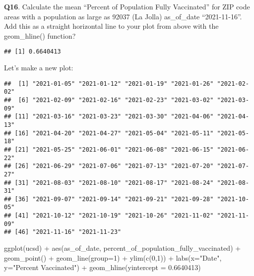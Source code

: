 \documentclass[
]{article}
\newenvironment{Shaded}{\begin{snugshade}}{\end{snugshade}}
\newcommand{\AttributeTok}[1]{\textcolor[rgb]{0.77,0.63,0.00}{#1}}
\newcommand{\DecValTok}[1]{\textcolor[rgb]{0.00,0.00,0.81}{#1}}
\newcommand{\FloatTok}[1]{\textcolor[rgb]{0.00,0.00,0.81}{#1}}
\newcommand{\FunctionTok}[1]{\textcolor[rgb]{0.00,0.00,0.00}{#1}}
\newcommand{\NormalTok}[1]{#1}
\newcommand{\SpecialCharTok}[1]{\textcolor[rgb]{0.00,0.00,0.00}{#1}}
\newcommand{\StringTok}[1]{\textcolor[rgb]{0.31,0.60,0.02}{#1}}
\begin{document}
\textbf{Q16}. Calculate the mean ``Percent of Population Fully
Vaccinated'' for ZIP code areas with a population as large as 92037 (La
Jolla) as\_of\_date ``2021-11-16''. Add this as a straight horizontal
line to your plot from above with the geom\_hline() function?

\begin{Shaded}
\end{Shaded}

\begin{verbatim}
## [1] 0.6640413
\end{verbatim}

Let's make a new plot:

\begin{Shaded}
\end{Shaded}

\begin{verbatim}
##  [1] "2021-01-05" "2021-01-12" "2021-01-19" "2021-01-26" "2021-02-02"
##  [6] "2021-02-09" "2021-02-16" "2021-02-23" "2021-03-02" "2021-03-09"
## [11] "2021-03-16" "2021-03-23" "2021-03-30" "2021-04-06" "2021-04-13"
## [16] "2021-04-20" "2021-04-27" "2021-05-04" "2021-05-11" "2021-05-18"
## [21] "2021-05-25" "2021-06-01" "2021-06-08" "2021-06-15" "2021-06-22"
## [26] "2021-06-29" "2021-07-06" "2021-07-13" "2021-07-20" "2021-07-27"
## [31] "2021-08-03" "2021-08-10" "2021-08-17" "2021-08-24" "2021-08-31"
## [36] "2021-09-07" "2021-09-14" "2021-09-21" "2021-09-28" "2021-10-05"
## [41] "2021-10-12" "2021-10-19" "2021-10-26" "2021-11-02" "2021-11-09"
## [46] "2021-11-16" "2021-11-23"
\end{verbatim}

\begin{Shaded}
\begin{Highlighting}[]
\FunctionTok{ggplot}\NormalTok{(ucsd) }\SpecialCharTok{+}
  \FunctionTok{aes}\NormalTok{(as\_of\_date, }
\NormalTok{  percent\_of\_population\_fully\_vaccinated) }\SpecialCharTok{+}
  \FunctionTok{geom\_point}\NormalTok{() }\SpecialCharTok{+}
  \FunctionTok{geom\_line}\NormalTok{(}\AttributeTok{group=}\DecValTok{1}\NormalTok{) }\SpecialCharTok{+}
  \FunctionTok{ylim}\NormalTok{(}\FunctionTok{c}\NormalTok{(}\DecValTok{0}\NormalTok{,}\DecValTok{1}\NormalTok{)) }\SpecialCharTok{+}
  \FunctionTok{labs}\NormalTok{(}\AttributeTok{x=}\StringTok{"Date"}\NormalTok{, }\AttributeTok{y=}\StringTok{"Percent Vaccinated"}\NormalTok{) }\SpecialCharTok{+}
  \FunctionTok{geom\_hline}\NormalTok{(}\AttributeTok{yintercept =} \FloatTok{0.6640413}\NormalTok{)}
\end{Highlighting}
\end{Shaded}
\end{document}

